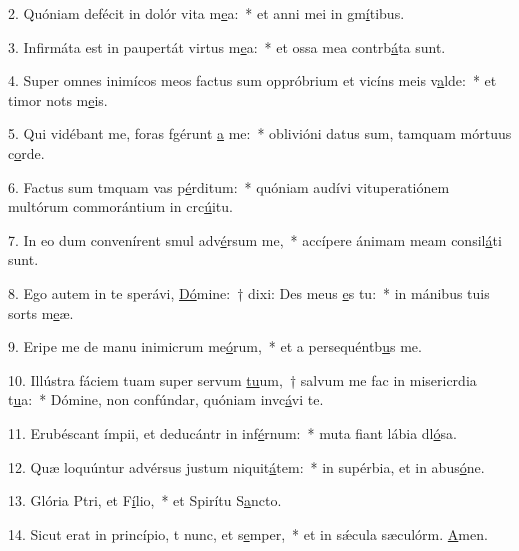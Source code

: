 2. Quóniam defécit in dolór vita m\uline{e}a:~* et anni mei in gm\uline{í}tibus.\par 
3. Infirmáta est in paupertát virtus m\uline{e}a:~* et ossa mea contrb\uline{á}ta sunt.\par 
4. Super omnes inimícos meos factus sum oppróbrium et vicíns meis v\uline{a}lde:~* et timor nots m\uline{e}is.\par 
5. Qui vidébant me, foras fgérunt \uline{a} me:~* oblivióni datus sum, tamquam mórtuus  c\uline{o}rde.\par 
6. Factus sum tmquam vas p\uline{é}rditum:~* quóniam audívi vituperatiónem multórum commorántium in crc\uline{ú}itu.\par 
7. In eo dum convenírent smul adv\uline{é}rsum me,~* accípere ánimam meam consil\uline{á}ti sunt.\par 
8. Ego autem in te sperávi, \uline{Dó}mine:~† dixi: Des meus \uline{e}s tu:~* in mánibus tuis sorts m\uline{e}æ.\par 
9. Eripe me de manu inimicrum me\uline{ó}rum,~* et a persequéntb\uline{u}s me.\par 
10. Illústra fáciem tuam super servum \uline{tu}um,~† salvum me fac in misericrdia t\uline{u}a:~* Dómine, non confúndar, quóniam invc\uline{á}vi te.\par 
11. Erubéscant ímpii, et deducántr in inf\uline{é}rnum:~* muta fiant lábia dl\uline{ó}sa.\par 
12. Quæ loquúntur advérsus justum niquit\uline{á}tem:~* in supérbia, et in abus\uline{ó}ne.\par 
13. Glória Ptri, et F\uline{í}lio,~* et Spirítu S\uline{a}ncto.\par 
14. Sicut erat in princípio, t nunc, et s\uline{e}mper,~* et in sǽcula sæculórm. \uline{A}men.\par 
